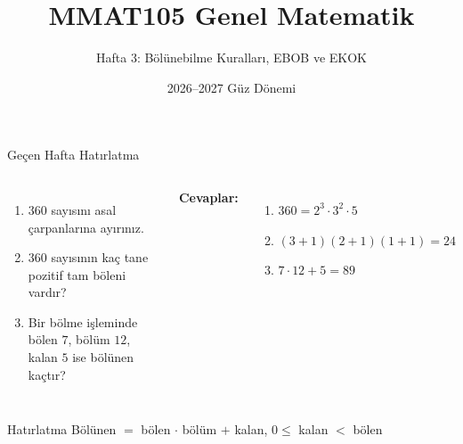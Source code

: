 \documentclass[aspectratio=169,11pt]{beamer}
\title[MMAT105 -- Hafta 3]{MMAT105 Genel Matematik}
\subtitle{Hafta 3: Bölünebilme Kuralları, EBOB ve EKOK}
\author{}
\date{2026--2027 Güz Dönemi}
\begin{document}
\begin{frame}
\titlepage
\end{frame}


\begin{frame}{Geçen Hafta Hatırlatma}
\begin{columns}[t]
\begin{enumerate}
\item \(360\) sayısını asal çarpanlarına ayırınız.
\item \(360\) sayısının kaç tane pozitif tam böleni vardır?
\item Bir bölme işleminde bölen \(7\), bölüm \(12\), kalan \(5\) ise bölünen kaçtır?
\end{enumerate}
\pause
\textbf{Cevaplar:}
\begin{enumerate}
\item \(360=2^3\cdot 3^2\cdot 5\)
\item \((3+1)(2+1)(1+1)=24\)
\item \(7\cdot 12+5=89\)
\end{enumerate}
\end{columns}
\vspace{6pt}
\begin{block}{Hatırlatma}
Bölünen \(=\) bölen \(\cdot\) bölüm \(+\) kalan, \qquad \(0\le\) kalan \(<\) bölen
\end{block}
\end{frame}
\end{document}
